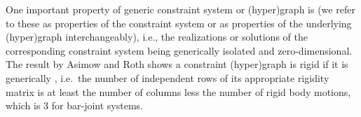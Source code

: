 
One important property of generic constraint system or (hyper)graph
is  (\note we refer to these as properties of the constraint system or as properties of the underlying (hyper)graph interchangeably), i.e., the realizations or solutions of the corresponding constraint system being generically isolated and zero-dimensional.%
The result by Asimow and Roth \cite{asimow1978rigidity}  shows a constraint (hyper)graph is rigid if it is generically , i.e.\ the number of independent rows of its appropriate rigidity matrix is at least the number of columns less the number of rigid body motions, which is 3 for bar-joint systems.



